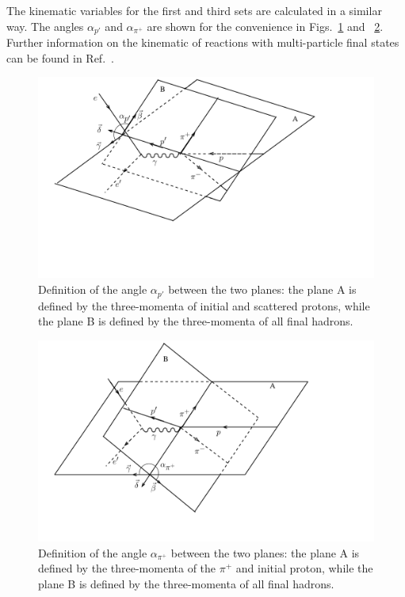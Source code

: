 The kinematic variables for the first and third sets are calculated in a similar way. The angles $\alpha_{p'}$ and $\alpha_{\pi^{+}}$ are shown for the convenience in Figs.~\ref{fig:cr_sec_kinematic1} and ~\ref{fig:cr_sec_kinematic3}. Further information on the kinematic of reactions with multi-particle final states can be found in Ref.~\cite{Byckling:1971vca}.


\begin{figure}[htp]
\begin{center}
\includegraphics[width=12cm]{pictures/cross_section/alpha2.pdf}
\caption{\small Definition of the angle $\alpha_{p'}$ between the two planes:  the plane A is defined by the three-momenta of initial and scattered protons, while the plane B is defined by the three-momenta of all final hadrons.} \label{fig:cr_sec_kinematic1}
\end{center}
\end{figure}
\begin{figure}[htp]
\begin{center}
\includegraphics[width=12cm]{pictures/cross_section/alpha3.pdf}
\caption{\small Definition of the angle $\alpha_{\pi^{+}}$ between the two planes: the plane A is defined by the three-momenta of the $\pi^{+}$ and initial proton, while the plane B is defined by the three-momenta of all final hadrons.} \label{fig:cr_sec_kinematic3}
\end{center}
\end{figure}
\clearpage




